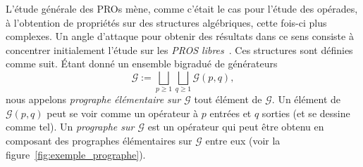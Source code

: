 \documentclass[10pt,reqno]{amsart}
\numberwithin{equation}{subsection}
\renewcommand{\geq}{\geqslant}
\newcommand{\Gen}{\mathcal{G}}
\begin{document}
L'étude générale des PROs mène, comme c'était le cas pour l'étude des
opérades, à l'obtention de propriétés sur des structures algébriques,
cette fois-ci plus complexes. Un angle d'attaque pour obtenir des
résultats dans ce sens consiste à concentrer initialement l'étude sur
les {\em PROS libres}~\cite{Laf03,Mar08,BG14}. Ces structures sont
définies comme suit. Étant donné un ensemble bigradué de générateurs
\begin{equation}
    \Gen :=
    \bigsqcup_{p \geq 1} \bigsqcup_{q \geq 1} \Gen(p, q),
\end{equation}
nous appelons {\em prographe élémentaire sur $\Gen$} tout élément de
$\Gen$. Un élément de $\Gen(p, q)$ peut se voir comme un opérateur
à $p$ entrées et $q$ sorties (et se dessine comme tel). Un
{\em prographe sur $\Gen$} est un opérateur qui peut être obtenu en
composant des prographes élémentaires sur $\Gen$ entre eux
(voir la figure~\ref{fig:exemple_prographe}).
\end{document}
